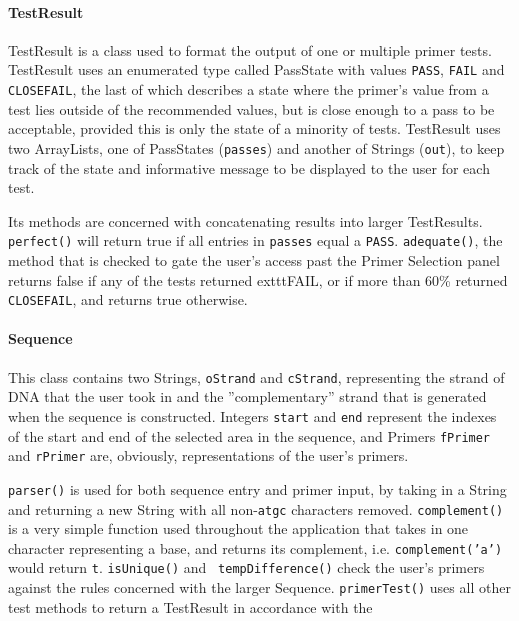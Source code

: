 \paragraph{TestResult}
TestResult is a class used to format the output of one or multiple primer 
tests. TestResult uses an enumerated type called PassState with values
\texttt{PASS}, \texttt{FAIL} and \texttt{CLOSEFAIL}, the last of which describes 
a state where the primer's value from a test lies outside of the recommended
values, but is close enough to a pass to be acceptable, provided this is 
only the state of a minority of tests. TestResult uses two ArrayLists, one of
PassStates (\texttt{passes}) and another of Strings (\texttt{out}), to keep track 
of the state and informative message to be displayed to the user for each 
test. 

Its methods are concerned with concatenating results into larger 
TestResults. \texttt{perfect()} will return true if all entries in 
\texttt{passes} equal a \texttt{PASS}. \texttt{adequate()}, the method that is 
checked to gate the user's access past the Primer Selection panel returns 
false if any of the tests returned 	exttt{FAIL}, or if more than 60\% 
returned \texttt{CLOSEFAIL}, and returns true otherwise.

%
\paragraph{Sequence}
This class contains two Strings, \texttt{oStrand} and \texttt{cStrand}, 
representing the strand of DNA that the user took in and the ''complementary''
strand that is generated when the sequence is constructed. Integers 
\texttt{start} and \texttt{end} represent the indexes of the start and end of 
the selected area in the sequence, and Primers \texttt{fPrimer} and 
\texttt{rPrimer} are, obviously, representations of the user's primers.
 
\texttt{parser()} is used for both sequence entry and primer input, by taking in
a String and returning a new String with all non-\texttt{atgc} characters removed.
\texttt{complement()} is a very simple function used throughout the application
that takes in one character representing a base, and returns its complement, i.e.
\texttt{complement('a')} would return \texttt{t}. \texttt{isUnique()} and \texttt{
tempDifference()} check the user's primers against the rules concerned with the
larger Sequence. \texttt{primerTest()} uses all other test methods to return a
TestResult in accordance with the  																										%
